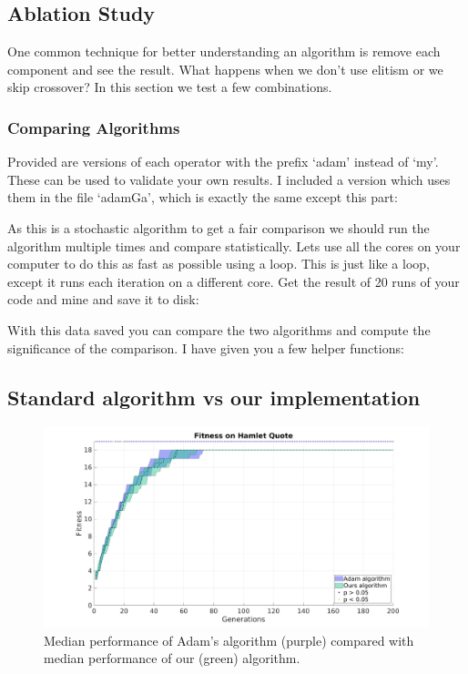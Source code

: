 \documentclass{article}
\begin{document}
\subsection{Ablation Study}
One common technique for better understanding an algorithm is remove each component and see the result. What happens when we don't use elitism or we skip crossover? In this section we test a few combinations. 

\subsubsection{Comparing Algorithms}
Provided are versions of each operator with the prefix `adam' instead of `my'. These can be used to validate your own results. I included a version which uses them in the file `adamGa', which is exactly the same except this part:

	

As this is a stochastic algorithm to get a fair comparison we should run the algorithm multiple times and compare statistically. Lets use all the cores on your computer to do this as fast as possible using a  loop. This is just like a  loop, except it runs each iteration on a different core. Get the result of 20 runs of your code and mine and save it to disk:

	

With this data saved you can compare the two algorithms and compute the significance of the comparison. I have given you a few helper functions:

	
	\newpage
\subsection*{Standard algorithm vs our implementation}
	\begin{figure}[h!]
	\begin{center}
	\includegraphics[width=1.17\textwidth]{img/1_vsStandard.png}
	\caption{\color{red} Median performance of Adam's algorithm (purple) compared with median performance of our (green) algorithm.}
	\end{center}
	\end{figure}
	
\end{document}
